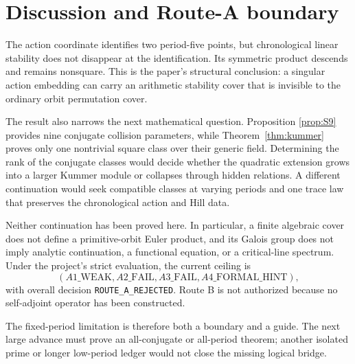 \section{Discussion and Route-A boundary}

The action coordinate identifies two period-five points, but chronological
linear stability does not disappear at the identification.  Its symmetric
product descends and remains nonsquare.  This is the paper's structural
conclusion: a singular action embedding can carry an arithmetic stability
cover that is invisible to the ordinary orbit permutation cover.

The result also narrows the next mathematical question.  Proposition
\ref{prop:S9} provides nine conjugate collision parameters, while
Theorem~\ref{thm:kummer} proves only one nontrivial square class over their
generic field.  Determining the rank of the conjugate classes would decide
whether the quadratic extension grows into a larger Kummer module or
collapses through hidden relations.  A different continuation would seek
compatible classes at varying periods and one trace law that preserves the
chronological action and Hill data.

Neither continuation has been proved here.  In particular, a finite
algebraic cover does not define a primitive-orbit Euler product, and its
Galois group does not imply analytic continuation, a functional equation,
or a critical-line spectrum.  Under the project's strict evaluation, the
current ceiling is
\[
(A1\_\mathrm{WEAK},A2\_\mathrm{FAIL},A3\_\mathrm{FAIL},
A4\_\mathrm{FORMAL\_HINT}),
\]
with overall decision \texttt{ROUTE\_A\_REJECTED}.  Route B is not
authorized because no self-adjoint operator has been constructed.

The fixed-period limitation is therefore both a boundary and a guide.  The
next large advance must prove an all-conjugate or all-period theorem; another
isolated prime or longer low-period ledger would not close the missing
logical bridge.
